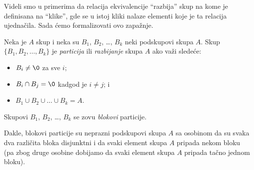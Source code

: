 Videli smo u primerima da relacija ekvivalencije ``razbija'' skup na kome je definisana na ``klike'', gde se u istoj
kliki nalaze elementi koje je ta relacija ujedna\v cila. Sada \'cemo formalizovati ovo zapa\v znje.

  Neka je $A$ skup i neka su $B_1$, $B_2$, \ldots, $B_k$ neki podskupovi skupa $A$.
  Skup $\{B_1, B_2, \ldots, B_k\}$ je \emph{particija} ili \emph{razbijanje} skupa $A$
  ako va\v zi slede\'ce:

\bigskip

\noindent
\begin{minipage}{3in}
  \begin{itemize}\itemsep -1.5pt
  \item $B_i \ne \0$ za sve $i$;
  \item $B_i \cap B_j = \0$ kadgod je $i \ne j$; i
  \item $B_1 \cup B_2 \cup \ldots \cup B_k = A$.
  \end{itemize}

  Skupovi $B_1$, $B_2$, \ldots, $B_k$ se zovu \emph{blokovi} particije.

  \hspace*{1.5em}Dakle, blokovi particije su neprazni podskupovi skupa $A$ sa osobinom da su svaka dva razli\v cita bloka disjunktni
  i da svaki element skupa $A$ pripada nekom bloku (pa zbog druge osobine dobijamo da svaki element skupa $A$ pripada
  ta\v cno jednom bloku).
\end{minipage}
\hfill
\begin{minipage}{2.5in}
  \begin{center}
    
  \end{center}
\end{minipage}

